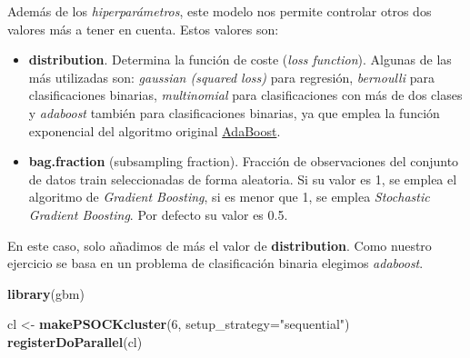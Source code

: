 \documentclass[]{article}
\newenvironment{Shaded}{\begin{snugshade}}{\end{snugshade}}
\newcommand{\DataTypeTok}[1]{\textcolor[rgb]{0.13,0.29,0.53}{#1}}
\newcommand{\DecValTok}[1]{\textcolor[rgb]{0.00,0.00,0.81}{#1}}
\newcommand{\KeywordTok}[1]{\textcolor[rgb]{0.13,0.29,0.53}{\textbf{#1}}}
\newcommand{\NormalTok}[1]{#1}
\newcommand{\StringTok}[1]{\textcolor[rgb]{0.31,0.60,0.02}{#1}}
\begin{document}
Además de los \emph{hiperparámetros}, este modelo nos permite controlar 
otros dos valores más a tener en cuenta. Estos valores son:

\begin{itemize}
\item
  \textbf{distribution}. Determina la función de coste (\emph{loss
  function}). Algunas de las más utilizadas son: \emph{gaussian
  (squared loss)} para regresión, \emph{bernoulli} para clasificaciones
  binarias, \emph{multinomial} para clasificaciones con más de dos clases y
  \emph{adaboost} también para clasificaciones binarias, ya que emplea la función
  exponencial del algoritmo original
  \href{https://en.wikipedia.org/wiki/AdaBoost}{\color{blue}AdaBoost}.
\item
  \textbf{bag.fraction} (subsampling fraction). Fracción de
  observaciones del conjunto de datos train seleccionadas de forma aleatoria.
  Si su valor es 1, se emplea el algoritmo de \emph{Gradient
  Boosting}, si es menor que 1, se emplea \emph{Stochastic Gradient
  Boosting}. Por defecto su valor es 0.5.
\end{itemize}

En este caso, solo añadimos de más el valor de \textbf{distribution}. Como nuestro
ejercicio se basa en un problema de clasificación binaria elegimos \emph{adaboost}.

\vspace{3mm}

\begin{Shaded}
\begin{Highlighting}[]
\KeywordTok{library}\NormalTok{(gbm)}
\end{Highlighting}
\end{Shaded}

\begin{Shaded}
\begin{Highlighting}[]
\NormalTok{cl <-}\StringTok{ }\KeywordTok{makePSOCKcluster}\NormalTok{(}\DecValTok{6}\NormalTok{, }\DataTypeTok{setup_strategy=}\StringTok{"sequential"}\NormalTok{)}
\KeywordTok{registerDoParallel}\NormalTok{(cl)}
\end{Highlighting}
\end{Shaded}
\end{document}
